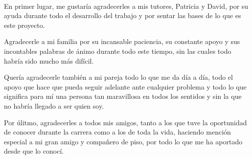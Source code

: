 \documentclass[11pt,a4paper,titlepage,oneside]{report}
\begin{document}
\setlength\arrayrulewidth{0.7pt}



\paxinaenbranco\
\begin{agradecementos}
  En primer lugar, me gustaría agradecerles a mis tutores, Patricia y David, por su ayuda durante todo el desarrollo del trabajo y por sentar
  las bases de lo que es este proyecto.

  Agradecerle a mi familia por su incansable paciencia, su constante apoyo y sus incontables
  palabras de ánimo durante todo este tiempo, sin las cuales todo habría sido mucho más difícil.

  Quería agradecerle también a mi pareja todo lo que me da día a día, todo el apoyo que hace que pueda
  seguir adelante ante cualquier problema y todo lo que significa para mí una persona tan maravillosa
  en todos los sentidos y sin la que no habría llegado a ser quien soy.

  Por úlitmo, agradecerles a todos mis amigos, tanto a los que tuve la oportunidad de conocer durante
  la carrera como a los de toda la vida, haciendo mención especial a mi gran amigo y compañero de
  piso, por todo lo que me ha aportado desde que lo conocí.
\end{agradecementos}


\setcounter{page}{1}

\tableofcontents
\listoffigures
\listoftables
\clearpage

\setcounter{page}{1}














\printglossary[type=\acronymtype,title=\nomeglosarioacronimos]
\printglossary[title=\nomeglosariotermos]



\clearpage
\end{document}
